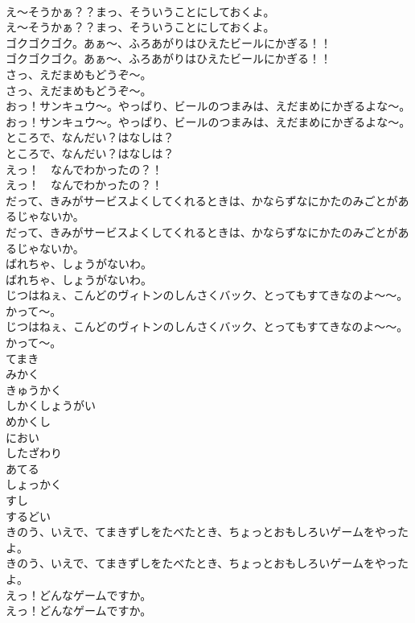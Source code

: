\documentclass[8pt]{extreport}
\begin{document}
\begin{CJK}{UTF8}{min}
\\	え～そうかぁ？？まっ、そういうことにしておくよ。
\\	え～そうかぁ？？まっ、そういうことにしておくよ。
\\	ゴクゴクゴク。あぁ～、ふろあがりはひえたビールにかぎる！！
\\	ゴクゴクゴク。あぁ～、ふろあがりはひえたビールにかぎる！！
\\	さっ、えだまめもどうぞ～。
\\	さっ、えだまめもどうぞ～。
\\	おっ！サンキュウ～。やっぱり、ビールのつまみは、えだまめにかぎるよな～。
\\	おっ！サンキュウ～。やっぱり、ビールのつまみは、えだまめにかぎるよな～。
\\	ところで、なんだい？はなしは？
\\	ところで、なんだい？はなしは？
\\	えっ！　なんでわかったの？！
\\	えっ！　なんでわかったの？！
\\	だって、きみがサービスよくしてくれるときは、かならずなにかたのみごとがあるじゃないか。
\\	だって、きみがサービスよくしてくれるときは、かならずなにかたのみごとがあるじゃないか。
\\	ばれちゃ、しょうがないわ。
\\	ばれちゃ、しょうがないわ。
\\	じつはねぇ、こんどのヴィトンのしんさくバック、とってもすてきなのよ～～。かって～。
\\	じつはねぇ、こんどのヴィトンのしんさくバック、とってもすてきなのよ～～。かって～。
\\	てまき
\\	みかく
\\	きゅうかく
\\	しかくしょうがい
\\	めかくし
\\	におい
\\	したざわり
\\	あてる
\\	しょっかく
\\	すし
\\	するどい
\\	きのう、いえで、てまきずしをたべたとき、ちょっとおもしろいゲームをやったよ。
\\	きのう、いえで、てまきずしをたべたとき、ちょっとおもしろいゲームをやったよ。
\\	えっ！どんなゲームですか。
\\	えっ！どんなゲームですか。

\end{CJK}
\end{document}
